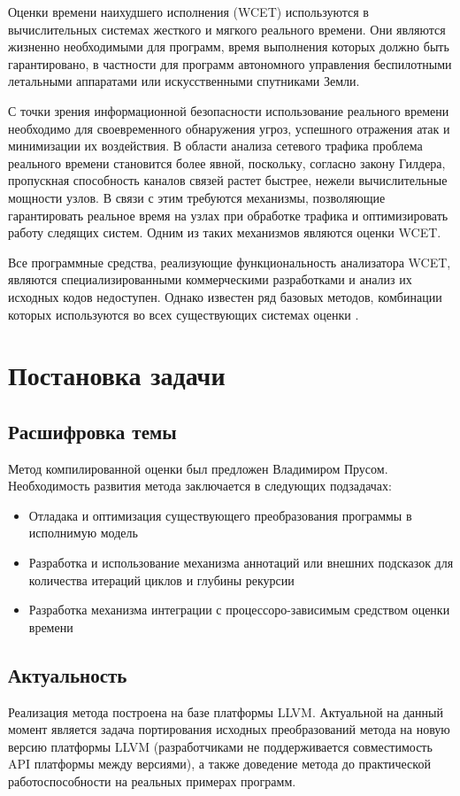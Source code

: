 \documentclass[12pt,a4paper]{article}
\begin{document}
Оценки времени наихудшего исполнения (WCET) используются в вычислительных системах жесткого и мягкого реального времени. Они являются жизненно необходимыми для программ, время выполнения которых должно быть гарантировано, в частности для программ автономного управления беспилотными летальными аппаратами или искусственными спутниками Земли.

С точки зрения информационной безопасности использование реального времени необходимо для своевременного обнаружения угроз, успешного отражения атак и минимизации их воздействия. В области анализа сетевого трафика проблема реального времени становится более явной, поскольку, согласно закону Гилдера, пропускная способность каналов связей растет быстрее, нежели вычислительные мощности узлов. В связи с этим требуются механизмы, позволяющие гарантировать реальное время на узлах при обработке трафика и оптимизировать работу следящих систем. Одним из таких механизмов являются оценки WCET.

Все программные средства, реализующие функциональность анализатора WCET, являются специализированными коммерческими разработками и анализ их исходных кодов недоступен. Однако известен ряд базовых методов, комбинации которых используются во всех существующих системах оценки  \cite{comsurvey}.

\section{Постановка задачи}

\subsection{Расшифровка темы}
Метод компилированной оценки был предложен Владимиром Прусом\cite{prus}. Необходимость развития метода заключается в следующих подзадачах:
\begin{itemize}
    \item Отладака и оптимизация существующего преобразования программы в исполнимую модель
    \item Разработка и использование механизма аннотаций или внешних подсказок для количества итераций циклов и глубины рекурсии
    \item Разработка механизма интеграции с процессоро-зависимым средством оценки времени
\end{itemize}


\subsection{Актуальность}
Реализация метода построена на базе платформы LLVM. Актуальной на данный момент является задача портирования исходных преобразований метода на новую версию платформы LLVM (разработчиками не поддерживается совместимость API платформы между версиями), а также доведение метода до практической работоспособности на реальных примерах программ. 
\end{document}
